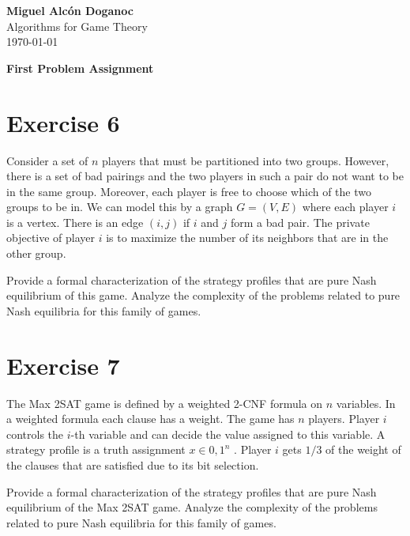 \documentclass[a4paper, 10pt]{article}
\begin{document}
\noindent
\begin{flushright}
    \large\textbf{Miguel Alcón Doganoc} \\
    Algorithms for Game Theory \\
    \today
\end{flushright}

\noindent
{\huge{\textbf{First Problem Assignment}}}

\section{Exercise 6}
{\color{statement} Consider a set of $n$ players that must be partitioned into two groups. However, there is a set of bad pairings and the two players in such a pair do not want to be in the same group. Moreover, each player is free to choose which of the two groups to be in. We can model this by a graph $G = (V, E)$ where each player $i$ is a vertex. There is an edge $(i, j)$ if $i$ and $j$ form a bad pair. The private objective of player $i$ is to maximize the number of its neighbors that are in the other group.

Provide a formal characterization of the strategy profiles that are pure Nash equilibrium of this game. Analyze the complexity of the problems related to pure Nash equilibria for this family of games.}

\section{Exercise 7}
{\color{statement} The Max 2SAT game is defined by a weighted 2-CNF formula on $n$ variables. In a weighted formula each clause has a weight. The game has $n$ players. Player $i$ controls the $i$-th variable and can decide the value assigned to this variable. A strategy profile is a truth assignment $x \in {0, 1}^n$ . Player $i$ gets $1/3$ of the weight of the clauses that are satisfied due to its bit selection.

Provide a formal characterization of the strategy profiles that are pure Nash equilibrium of the Max 2SAT game. Analyze the complexity of the problems related to pure Nash equilibria for this family of games.}
\end{document}
